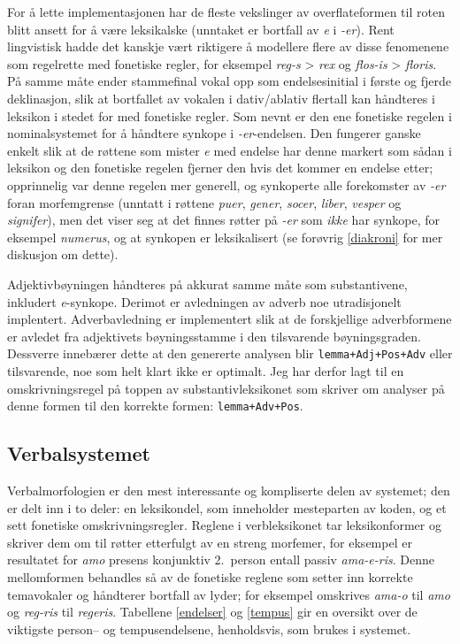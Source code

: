 \documentclass{article}
\newcommand\form[1]{\texttt{#1}}
\newcommand\note[1]{\marginpar{\raggedright\tiny#1}}
\newcommand\w[1]{\emph{#1}}
\begin{document}
For \aa{} lette implementasjonen har de fleste vekslinger av overflateformen
til roten blitt ansett for \aa{} v\ae{}re leksikalske (unntaket er bortfall av
\w{e} i \w{-er}). Rent lingvistisk hadde det kanskje v\ae{}rt riktigere \aa{}
modellere flere av disse fenomenene som regelrette med fonetiske regler, for
eksempel \w{reg-s} > \w{rex} og \w{flos-is} > \w{floris}. P\aa{} samme
m\aa{}te ender stammefinal vokal opp som endelsesinitial i f\o{}rste og fjerde
deklinasjon, slik at bortfallet av vokalen i dativ/ablativ flertall kan
h\aa{}ndteres i leksikon i stedet for med fonetiske regler. Som nevnt er den
ene fonetiske regelen i nominalsystemet for \aa{} h\aa{}ndtere
synkope\note{Synkope er riktig, no?} i \w{-er}-endelsen. Den fungerer ganske
enkelt slik at de r\o{}ttene som mister \w{e} med endelse har denne markert
som s\aa{}dan i leksikon og den fonetiske regelen fjerner den hvis det kommer
en endelse etter; opprinnelig var denne regelen mer generell, og synkoperte
alle forekomster av \w{-er} foran morfemgrense (unntatt i r\o{}ttene \w{puer},
\w{gener}, \w{socer}, \w{liber}, \w{vesper} og \w{signifer}), men det viser
seg at det finnes r\o{}tter p\aa{} \w{-er} som \emph{ikke} har synkope, for
eksempel \w{numerus}, og at synkopen er leksikalisert (se for\o{}vrig
\ref{diakroni} for mer diskusjon om dette).

Adjektivb\o{}yningen h\aa{}ndteres p\aa{} akkurat samme m\aa{}te som
substantivene, inkludert \w{e}-synkope. Derimot er avledningen av adverb noe
utradisjonelt implentert. Adverbavledning er implementert slik at de
forskjellige adverbformene er avledet fra adjektivets b\o{}yningsstamme i den
tilsvarende b\o{}yningsgraden. Dessverre inneb\ae{}rer dette at den genererte
analysen blir \form{lemma+Adj+Pos+Adv} eller tilsvarende, noe som helt klart
ikke er optimalt. Jeg har derfor lagt til en omskrivningsregel p\aa{} toppen
av substantivleksikonet som skriver om analyser p\aa{} denne formen til den
korrekte formen: \form{lemma+Adv+Pos}.

\subsection{Verbalsystemet}
\label{konjugasjon}
Verbalmorfologien er den mest interessante og kompliserte delen av systemet;
den er delt inn i to deler: en leksikondel, som inneholder mesteparten av
koden, og et sett fonetiske omskrivningsregler. Reglene i verbleksikonet tar
leksikonformer og skriver dem om til r\o{}tter etterfulgt av en streng
morfemer, for eksempel er resultatet for \w{amo} presens konjunktiv 2.~person
entall passiv \w{ama-e-ris}. Denne mellomformen behandles s\aa{} av de
fonetiske reglene som setter inn korrekte temavokaler og h\aa{}ndterer
bortfall av lyder; for eksempel omskrives \w{ama-o} til \w{amo} og \w{reg-ris}
til \w{regeris}. Tabellene \ref{endelser} og \ref{tempus} gir en oversikt over
de viktigste person-- og tempusendelsene, henholdsvis, som brukes i systemet.
\end{document}
